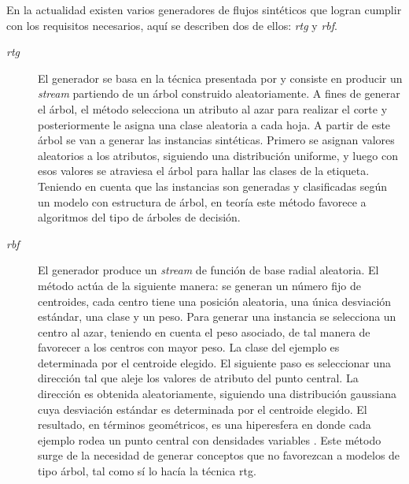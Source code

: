 En la actualidad existen varios generadores de flujos sintéticos que logran
cumplir con los requisitos necesarios, aquí se describen dos de ellos:
\textit{\acrfull{rtg}} y \textit{\acrfull{rbf}}.

\begin{description}

   \item[\textit{\acrfull{rtg}}] El generador se basa en la técnica presentada
      por \citeauthor{domingos_mining_2002} \cite{domingos_mining_2002} y
      consiste en producir un \textit{stream} partiendo de un árbol construido
      aleatoriamente. A fines de generar el árbol, el método selecciona un
      atributo al azar para realizar el corte y posteriormente le asigna una
      clase aleatoria a cada hoja. A partir de este árbol se van a generar las
      instancias sintéticas.  Primero se asignan valores aleatorios a los
      atributos, siguiendo una distribución uniforme, y luego con esos valores
      se atraviesa el árbol para hallar las clases de la etiqueta. Teniendo en
      cuenta que las instancias son generadas y clasificadas según un modelo con
      estructura de árbol, en teoría este método favorece a algoritmos del tipo
      de árboles de decisión.

   \item[\textit{\acrfull{rbf}}] El generador produce un \textit{stream} de
      función de base radial aleatoria. El método actúa de la siguiente manera:
      se generan un número fijo de centroides, cada centro tiene una posición
      aleatoria, una única desviación estándar, una clase y un peso. Para
      generar una instancia se selecciona un centro al azar, teniendo en cuenta
      el peso asociado, de tal manera de favorecer a los centros con mayor peso.
      La clase del ejemplo es determinada por el centroide elegido. El siguiente
      paso es seleccionar una dirección tal que aleje los valores de atributo
      del punto central. La dirección es obtenida aleatoriamente, siguiendo una
      distribución gaussiana cuya desviación estándar es determinada por el
      centroide elegido.  El resultado, en términos geométricos, es una
      hiperesfera en donde cada ejemplo rodea un punto central con densidades
      variables \cite{kirkby_improving_2007}. Este método surge de la
      necesidad de generar conceptos que no favorezcan a modelos de tipo árbol,
      tal como sí lo hacía la técnica \acrshort{rtg}.

\end{description}

